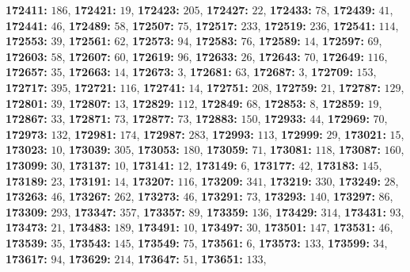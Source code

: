 \textsf{\bfseries 172411:} $186$, \textsf{\bfseries 172421:} $19$, \textsf{\bfseries 172423:} $205$, \textsf{\bfseries 172427:} $22$, \textsf{\bfseries 172433:} $78$, \textsf{\bfseries 172439:} $41$, \textsf{\bfseries 172441:} $46$, \textsf{\bfseries 172489:} $58$, \textsf{\bfseries 172507:} $75$, \textsf{\bfseries 172517:} $233$, \textsf{\bfseries 172519:} $236$, \textsf{\bfseries 172541:} $114$, \textsf{\bfseries 172553:} $39$, \textsf{\bfseries 172561:} $62$, \textsf{\bfseries 172573:} $94$, \textsf{\bfseries 172583:} $76$, \textsf{\bfseries 172589:} $14$, \textsf{\bfseries 172597:} $69$, \textsf{\bfseries 172603:} $58$, \textsf{\bfseries 172607:} $60$, \textsf{\bfseries 172619:} $96$, \textsf{\bfseries 172633:} $26$, \textsf{\bfseries 172643:} $70$, \textsf{\bfseries 172649:} $116$, \textsf{\bfseries 172657:} $35$, \textsf{\bfseries 172663:} $14$, \textsf{\bfseries 172673:} $3$, \textsf{\bfseries 172681:} $63$, \textsf{\bfseries 172687:} $3$, \textsf{\bfseries 172709:} $153$, \textsf{\bfseries 172717:} $395$, \textsf{\bfseries 172721:} $116$, \textsf{\bfseries 172741:} $14$, \textsf{\bfseries 172751:} $208$, \textsf{\bfseries 172759:} $21$, \textsf{\bfseries 172787:} $129$, \textsf{\bfseries 172801:} $39$, \textsf{\bfseries 172807:} $13$, \textsf{\bfseries 172829:} $112$, \textsf{\bfseries 172849:} $68$, \textsf{\bfseries 172853:} $8$, \textsf{\bfseries 172859:} $19$, \textsf{\bfseries 172867:} $33$, \textsf{\bfseries 172871:} $73$, \textsf{\bfseries 172877:} $73$, \textsf{\bfseries 172883:} $150$, \textsf{\bfseries 172933:} $44$, \textsf{\bfseries 172969:} $70$, \textsf{\bfseries 172973:} $132$, \textsf{\bfseries 172981:} $174$, \textsf{\bfseries 172987:} $283$, \textsf{\bfseries 172993:} $113$, \textsf{\bfseries 172999:} $29$, \textsf{\bfseries 173021:} $15$, \textsf{\bfseries 173023:} $10$, \textsf{\bfseries 173039:} $305$, \textsf{\bfseries 173053:} $180$, \textsf{\bfseries 173059:} $71$, \textsf{\bfseries 173081:} $118$, \textsf{\bfseries 173087:} $160$, \textsf{\bfseries 173099:} $30$, \textsf{\bfseries 173137:} $10$, \textsf{\bfseries 173141:} $12$, \textsf{\bfseries 173149:} $6$, \textsf{\bfseries 173177:} $42$, \textsf{\bfseries 173183:} $145$, \textsf{\bfseries 173189:} $23$, \textsf{\bfseries 173191:} $14$, \textsf{\bfseries 173207:} $116$, \textsf{\bfseries 173209:} $341$, \textsf{\bfseries 173219:} $330$, \textsf{\bfseries 173249:} $28$, \textsf{\bfseries 173263:} $46$, \textsf{\bfseries 173267:} $262$, \textsf{\bfseries 173273:} $46$, \textsf{\bfseries 173291:} $73$, \textsf{\bfseries 173293:} $140$, \textsf{\bfseries 173297:} $86$, \textsf{\bfseries 173309:} $293$, \textsf{\bfseries 173347:} $357$, \textsf{\bfseries 173357:} $89$, \textsf{\bfseries 173359:} $136$, \textsf{\bfseries 173429:} $314$, \textsf{\bfseries 173431:} $93$, \textsf{\bfseries 173473:} $21$, \textsf{\bfseries 173483:} $189$, \textsf{\bfseries 173491:} $10$, \textsf{\bfseries 173497:} $30$, \textsf{\bfseries 173501:} $147$, \textsf{\bfseries 173531:} $46$, \textsf{\bfseries 173539:} $35$, \textsf{\bfseries 173543:} $145$, \textsf{\bfseries 173549:} $75$, \textsf{\bfseries 173561:} $6$, \textsf{\bfseries 173573:} $133$, \textsf{\bfseries 173599:} $34$, \textsf{\bfseries 173617:} $94$, \textsf{\bfseries 173629:} $214$, \textsf{\bfseries 173647:} $51$, \textsf{\bfseries 173651:} $133$, 
